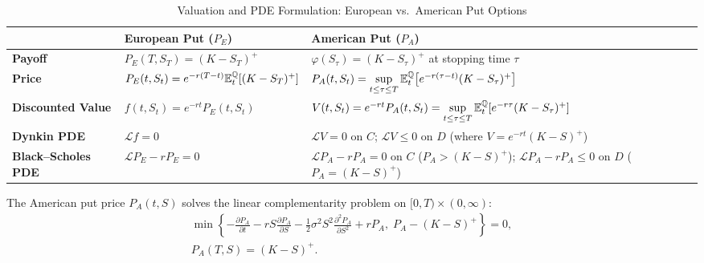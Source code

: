 \begin{table}[!htbp]
    \centering
    \small
    \caption{Valuation and PDE Formulation: European vs.\ American Put Options}\label{tab:eu-am-put}
    \renewcommand{\arraystretch}{1.5}
    \begin{tabularx}{\textwidth}{@{} l >{\raggedright\arraybackslash}X >{\raggedright\arraybackslash}X @{}}
        \toprule
        & \textbf{European Put ($P_E$)} & \textbf{American Put ($P_A$)} \\
        \midrule
        \textbf{Payoff}
            & $P_E(T, S_T) = (K - S_T)^+$
            & $\varphi(S_\tau) = (K - S_\tau)^+$ at stopping time $\tau$ \\
        \textbf{Price}
            & $P_E(t, S_t) = e^{-r(T-t)}\mathbb{E}_t^{\mathbb{Q}}[(K - S_T)^+]$
            & $P_A(t, S_t) = \sup\limits_{t \le \tau \le T} \mathbb{E}_t^{\mathbb{Q}}\!\left[e^{-r(\tau - t)}(K - S_\tau)^+\right]$ \\
        \textbf{Discounted Value}
            & $f(t, S_t) = e^{-rt} P_E(t, S_t)$
            & $V(t, S_t) = e^{-rt} P_A(t, S_t) = \sup\limits_{t \le \tau \le T} \mathbb{E}_t^{\mathbb{Q}}\!\left[e^{-r\tau}(K - S_\tau)^+\right]$ \\
        \midrule
        \textbf{Dynkin PDE}
            & $\mathcal{L} f = 0$
            & $\mathcal{L} V = 0$ on $C$; \quad $\mathcal{L} V \le 0$ on $D$ (where $V = e^{-rt}(K - S)^+$) \\
        \textbf{Black--Scholes PDE}
            & $\mathcal{L} P_E - r P_E = 0$
            & $\mathcal{L} P_A - r P_A = 0$ on $C$ ($P_A > (K - S)^+$); \newline
              $\mathcal{L} P_A - r P_A \le 0$ on $D$ ($P_A = (K - S)^+$) \\
        \bottomrule
    \end{tabularx}
\end{table}

\begin{proposition}\label{prop:lcp-american-put}
    The American put price $P_A(t, S)$ solves the linear complementarity problem on $[0, T) \times (0, \infty)$:
    \[
    \begin{gathered}
        \min\left\{-\frac{\partial P_A}{\partial t} - r S \frac{\partial P_A}{\partial S} - \frac{1}{2}\sigma^2 S^2 \frac{\partial^2 P_A}{\partial S^2} + r P_A,\; P_A - (K - S)^+\right\} = 0, \\
        P_A(T, S) = (K - S)^+.
    \end{gathered}
    \]
\end{proposition}

